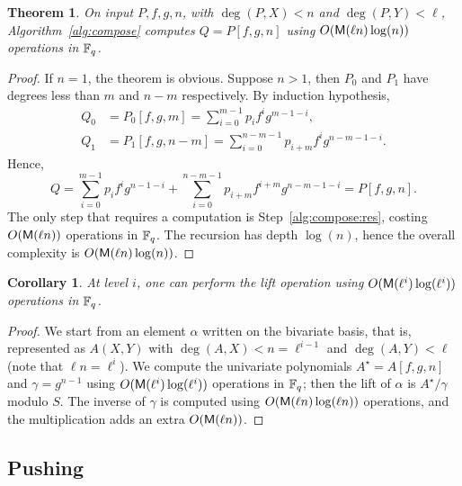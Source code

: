 \documentclass{sig-alternate}
\newtheorem{theorem}[definition]{Theorem}
\newtheorem{corollary}[definition]{Corollary}
\begin{document}
\begin{theorem}
  \label{th:compose}
  On input $P,f,g,n$, with $\deg(P,X)<n$ and $\deg(P,Y) < \ell$,
  Algorithm~\ref{alg:compose} computes $Q=P[f,g,n]$ using $O(\mathsf{M}(\ell
  n)\log(n))$ operations in $\mathbb{F}_q$.
\end{theorem}
\begin{proof}
  If $n=1$, the theorem is obvious. Suppose $n>1$, then $P_0$ and
  $P_1$ have degrees less than $m$ and $n-m$ respectively. By
  induction hypothesis,
  \begin{equation*}
    \begin{aligned}
      Q_0 &= P_0[f,g,m] = \sum_{i=0}^{m-1}p_if^ig^{m-1-i},\\
      Q_1 &= P_1[f,g,n-m] = \sum_{i=0}^{n-m-1}p_{i+m}f^ig^{n-m-1-i}.   
    \end{aligned}
  \end{equation*}
  Hence,
  \begin{equation*}
    Q = \sum_{i=0}^{m-1}p_if^ig^{n-1-i} +
    \sum_{i=0}^{n-m-1}p_{i+m}f^{i+m}g^{n-m-1-i} =
    P[f,g,n].
  \end{equation*}
  The only step that requires a computation is
  Step~\ref{alg:compose:res}, costing $O(\mathsf{M}(\ell n))$ operations in
  $\mathbb{F}_q$. The recursion has depth $\log(n)$, hence the overall
  complexity is $O(\mathsf{M}(\ell n)\log(n))$.
\end{proof}

\begin{corollary}
  At level $i$, one can perform the lift operation using
  $O(\mathsf{M}(\ell^i)\log(\ell^i))$ operations in $\mathbb{F}_q$.
\end{corollary}
\begin{proof}
  We start from an element $\alpha$ written on the bivariate basis, that
  is, represented as $A(X,Y)$ with $\deg(A,X)<n=\ell^{i-1}$ and
  $\deg(A,Y)<\ell$ (note that $\ell n =\ell^i$).  We compute the
  univariate polynomials $A^\star=A[f,g,n]$ and $\gamma=g^{n-1}$ using
  $O(\mathsf{M}(\ell^i)\log(\ell^i))$ operations in $\mathbb{F}_q$; then the lift
  of $\alpha$ is $A^\star/\gamma$ modulo $S$. The inverse of $\gamma$
  is computed using $O(\mathsf{M}(\ell n)\log(\ell n))$ operations, and the
  multiplication adds an extra $O(\mathsf{M}(\ell n))$.
\end{proof}


\subsection{Pushing}
\end{document}
